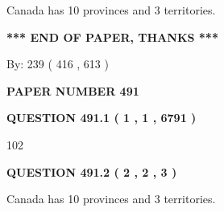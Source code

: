 \documentclass[12pt]{article}
\begin{document}
 
Canada has 10  provinces and 3 territories.
 
 
 
 
   
   
 \vspace{0.2in}
 
   
   
   
   
\vspace{1.0in} 
{\textbf{\large{ *** END OF PAPER, THANKS *** }}} 
   
   
\hspace{1.0in} By: 
 239 ( 416 ,  613 )
   
   
   
   
\newpage 
\setcounter{page}{ 
   491001 } 
   
   
   
   
 {\textbf{ \Large{ PAPER NUMBER  491  }}}
   
   
\vspace{0.2in}
   
   
   
   
   
   
 \vspace{0.2in}
 
 
 
 
   
   
  
\vspace{0.2in}
  
{\textbf{\Large{QUESTION
491.1 
 ( 1 , 1 , 6791 )
}}}
  
  
 
 
\noindent{}

102
 
 
  
\vspace{0.2in}
  
{\textbf{\Large{QUESTION
491.2 
 ( 2 , 2 , 3 )
}}}
  
  
 
 
\noindent{}
 
 
Canada has 10  provinces and 3 territories.
 
 
 
 
   
   
 \vspace{0.2in}
 
\end{document}
